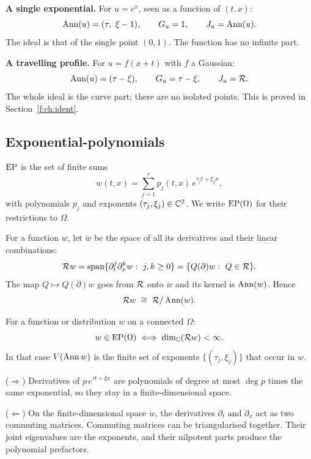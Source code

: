 \begin{example}
\textbf{A single exponential.} For $u=e^{x}$, seen as a function of $(t,x)$:
\[
\operatorname{Ann}(u)=(\tau,\ \xi-1),\qquad G_u=1,\qquad J_u=\operatorname{Ann}(u).
\]
The ideal is that of the single point $(0,1)$. The function has no infinite part.

\textbf{A travelling profile.} For $u=f(x+t)$ with $f$ a Gaussian:
\[
\operatorname{Ann}(u)=(\tau-\xi),\qquad G_u=\tau-\xi,\qquad J_u=\mathcal{R} .
\]
The whole ideal is the curve part; there are no isolated points. This is proved in Section~\ref{f:ch:ident}.
\end{example}

\subsection{Exponential-polynomials}

\begin{definition}\label{f:def:ep}
$\mathrm{EP}$ is the set of finite sums
\[
w(t,x)=\sum_{j=1}^{r}p_j(t,x)\,e^{\tau_jt+\xi_jx},
\]
with polynomials $p_j$ and exponents $(\tau_j,\xi_j)\in\mathbb{C}^2$. We write $\mathrm{EP}(\Omega)$ for their restrictions to $\Omega$.
\end{definition}

For a function $w$, let $\ring w$ be the space of all its derivatives and their linear combinations:
\[
\ring w=\spn\{\partial_t^j\partial_x^k w:\ j,k\ge0\}=\{Q(\partial)w:\ Q\in\ring\}.
\]
The map $Q\mapsto Q(\partial)w$ goes from $\mathcal{R}$ onto $\ring w$ and its kernel is $\operatorname{Ann}(w)$. Hence
\[
\mathcal{R} w\;\cong\;\mathcal{R}/\operatorname{Ann}(w).
\]

\begin{lemma}\label{f:lem:ep}
For a function or distribution $w$ on a connected $\Omega$:
\[
w\in\mathrm{EP}(\Omega)\iff\operatorname{dim}_{\mathbb{C}}(\mathcal{R} w)<\infty .
\]
In that case $V(\operatorname{Ann} w)$ is the finite set of exponents $\{(\tau_j,\xi_j)\}$ that occur in $w$.

\end{lemma}

\begin{intuition}
($\Rightarrow$) Derivatives of $p\,e^{\tau t+\xi x}$ are polynomials of degree at most $\deg p$ times the same exponential, so they stay in a finite-dimensional space.

($\Leftarrow$) On the finite-dimensional space $\ring w$, the derivatives $\partial_t$ and $\partial_x$ act as two commuting matrices. Commuting matrices can be triangularised together. Their joint eigenvalues are the exponents, and their nilpotent parts produce the polynomial prefactors.
\end{intuition}

